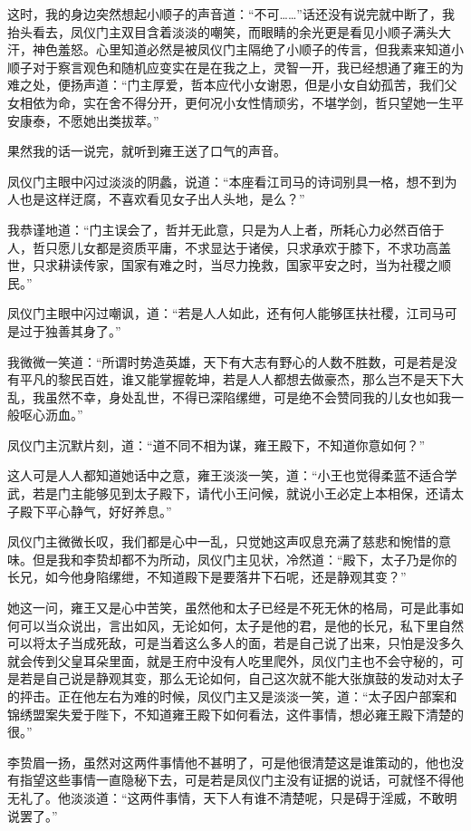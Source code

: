 这时，我的身边突然想起小顺子的声音道：“不可……”话还没有说完就中断了，我抬头看去，凤仪门主双目含着淡淡的嘲笑，而眼睛的余光更是看见小顺子满头大汗，神色羞怒。心里知道必然是被凤仪门主隔绝了小顺子的传言，但我素来知道小顺子对于察言观色和随机应变实在是在我之上，灵智一开，我已经想通了雍王的为难之处，便扬声道：“门主厚爱，哲本应代小女谢恩，但是小女自幼孤苦，我们父女相依为命，实在舍不得分开，更何况小女性情顽劣，不堪学剑，哲只望她一生平安康泰，不愿她出类拔萃。”

果然我的话一说完，就听到雍王送了口气的声音。

凤仪门主眼中闪过淡淡的阴蠡，说道：“本座看江司马的诗词别具一格，想不到为人也是这样迂腐，不喜欢看见女子出人头地，是么？”

我恭谨地道：“门主误会了，哲并无此意，只是为人上者，所耗心力必然百倍于人，哲只愿儿女都是资质平庸，不求显达于诸侯，只求承欢于膝下，不求功高盖世，只求耕读传家，国家有难之时，当尽力挽救，国家平安之时，当为社稷之顺民。”

凤仪门主眼中闪过嘲讽，道：“若是人人如此，还有何人能够匡扶社稷，江司马可是过于独善其身了。”

我微微一笑道：“所谓时势造英雄，天下有大志有野心的人数不胜数，可是若是没有平凡的黎民百姓，谁又能掌握乾坤，若是人人都想去做豪杰，那么岂不是天下大乱，我虽然不幸，身处乱世，不得已深陷缧绁，可是绝不会赞同我的儿女也如我一般呕心沥血。”

凤仪门主沉默片刻，道：“道不同不相为谋，雍王殿下，不知道你意如何？”

这人可是人人都知道她话中之意，雍王淡淡一笑，道：“小王也觉得柔蓝不适合学武，若是门主能够见到太子殿下，请代小王问候，就说小王必定上本相保，还请太子殿下平心静气，好好养息。”

凤仪门主微微长叹，我们都是心中一乱，只觉她这声叹息充满了慈悲和惋惜的意味。但是我和李贽却都不为所动，凤仪门主见状，冷然道：“殿下，太子乃是你的长兄，如今他身陷缧绁，不知道殿下是要落井下石呢，还是静观其变？”

她这一问，雍王又是心中苦笑，虽然他和太子已经是不死无休的格局，可是此事如何可以当众说出，言出如风，无论如何，太子是他的君，是他的长兄，私下里自然可以将太子当成死敌，可是当着这么多人的面，若是自己说了出来，只怕是没多久就会传到父皇耳朵里面，就是王府中没有人吃里爬外，凤仪门主也不会守秘的，可是若是自己说是静观其变，那么无论如何，自己这次就不能大张旗鼓的发动对太子的抨击。正在他左右为难的时候，凤仪门主又是淡淡一笑，道：“太子因户部案和锦绣盟案失爱于陛下，不知道雍王殿下如何看法，这件事情，想必雍王殿下清楚的很。”

李贽眉一扬，虽然对这两件事情他不甚明了，可是他很清楚这是谁策动的，他也没有指望这些事情一直隐秘下去，可是若是凤仪门主没有证据的说话，可就怪不得他无礼了。他淡淡道：“这两件事情，天下人有谁不清楚呢，只是碍于淫威，不敢明说罢了。”


